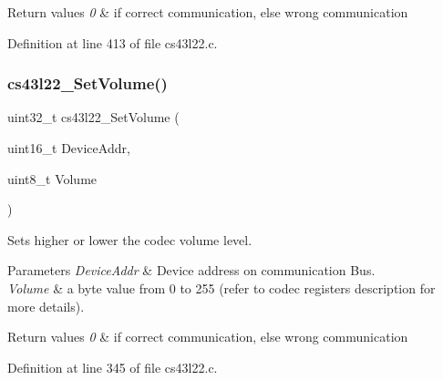 \begin{DoxyRetVals}{Return values}
{\em 0} & if correct communication, else wrong communication \\
\hline
\end{DoxyRetVals}


Definition at line 413 of file cs43l22.\+c.

\mbox{\label{group___c_s43_l22___exported___functions_ga9cd060bb226e44065ec50c7803041114}} 
\subsubsection{\texorpdfstring{cs43l22\+\_\+\+Set\+Volume()}{cs43l22\_SetVolume()}}
{\footnotesize\ttfamily uint32\+\_\+t cs43l22\+\_\+\+Set\+Volume (\begin{DoxyParamCaption}\item[{uint16\+\_\+t}]{Device\+Addr,  }\item[{uint8\+\_\+t}]{Volume }\end{DoxyParamCaption})}



Sets higher or lower the codec volume level. 


\begin{DoxyParams}{Parameters}
{\em Device\+Addr} & Device address on communication Bus. ~\newline
\\
\hline
{\em Volume} & a byte value from 0 to 255 (refer to codec registers description for more details). \\
\hline
\end{DoxyParams}

\begin{DoxyRetVals}{Return values}
{\em 0} & if correct communication, else wrong communication \\
\hline
\end{DoxyRetVals}


Definition at line 345 of file cs43l22.\+c.

\mbox{\label{group___c_s43_l22___exported___functions_ga8e551ac489dbd2b701f0ac6ed54c143b}} 
